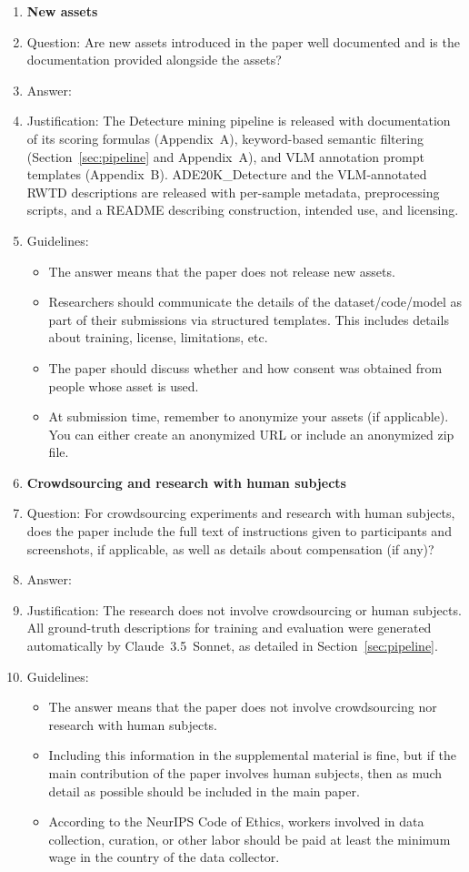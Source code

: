 \begin{enumerate}
\item {\bf New assets}
    \item[] Question: Are new assets introduced in the paper well documented and is the documentation provided alongside the assets?
    \item[] Answer: \answerYes{}
    \item[] Justification: The Detecture mining pipeline is released with documentation of its scoring formulas (Appendix~A), keyword-based semantic filtering (Section~\ref{sec:pipeline} and Appendix~A), and VLM annotation prompt templates (Appendix~B). ADE20K\_Detecture and the VLM-annotated RWTD descriptions are released with per-sample metadata, preprocessing scripts, and a README describing construction, intended use, and licensing.
    \item[] Guidelines:
    \begin{itemize}
        \item The answer \answerNA{} means that the paper does not release new assets.
        \item Researchers should communicate the details of the dataset\slash code\slash model as part of their submissions via structured templates. This includes details about training, license, limitations, etc.
        \item The paper should discuss whether and how consent was obtained from people whose asset is used.
        \item At submission time, remember to anonymize your assets (if applicable). You can either create an anonymized URL or include an anonymized zip file.
    \end{itemize}

\item {\bf Crowdsourcing and research with human subjects}
    \item[] Question: For crowdsourcing experiments and research with human subjects, does the paper include the full text of instructions given to participants and screenshots, if applicable, as well as details about compensation (if any)?
    \item[] Answer: \answerNA{}
    \item[] Justification: The research does not involve crowdsourcing or human subjects. All ground-truth descriptions for training and evaluation were generated automatically by Claude~3.5~Sonnet, as detailed in Section~\ref{sec:pipeline}.
    \item[] Guidelines:
    \begin{itemize}
        \item The answer \answerNA{} means that the paper does not involve crowdsourcing nor research with human subjects.
        \item Including this information in the supplemental material is fine, but if the main contribution of the paper involves human subjects, then as much detail as possible should be included in the main paper.
        \item According to the NeurIPS Code of Ethics, workers involved in data collection, curation, or other labor should be paid at least the minimum wage in the country of the data collector.
    \end{itemize}


\end{enumerate}
